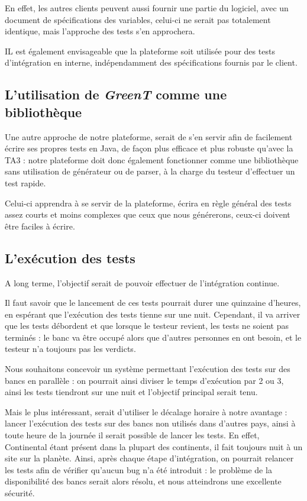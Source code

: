 	En effet, les autres clients peuvent aussi fournir une partie du logiciel, avec un document de spécifications des variables, celui-ci ne serait pas totalement identique, mais l'approche des tests s'en approchera.

	IL est également envisageable que la plateforme soit utilisée pour des tests d'intégration en interne, indépendamment des spécifications fournis par le client.

	\subsection{L'utilisation de \textit{GreenT} comme une bibliothèque}
		Une autre approche de notre plateforme, serait de s'en servir afin de facilement écrire ses propres tests en Java, de façon plus efficace et plus robuste qu'avec la TA3 : notre plateforme doit donc également fonctionner comme une bibliothèque sans utilisation de générateur ou de parser, à la charge du testeur d'effectuer un test rapide. 

		Celui-ci apprendra à se servir de la plateforme, écrira en règle général des tests assez courts et moins complexes que ceux que nous générerons, ceux-ci doivent être faciles à écrire.

	\subsection{L'exécution des tests}
	A long terme, l'objectif serait de pouvoir effectuer de l'intégration continue. 

	Il faut savoir que le lancement de ces tests pourrait durer une quinzaine d'heures, en espérant que l'exécution des tests tienne sur une nuit. Cependant, il va arriver que les tests débordent et que lorsque le testeur revient, les tests ne soient pas terminés : le banc va être occupé alors que d'autres personnes en ont besoin, et le testeur n'a toujours pas les verdicts.

	 Nous souhaitons concevoir un système permettant l'exécution des tests sur des bancs en parallèle : on pourrait ainsi diviser le temps d'exécution par 2 ou 3, ainsi les tests tiendront sur une nuit et l'objectif principal serait tenu.

	 Mais le plus intéressant, serait d'utiliser le décalage horaire à notre avantage : lancer l'exécution des tests sur des bancs non utilisés dans d'autres pays, ainsi à toute heure de la journée il serait possible de lancer les tests. En effet, Continental étant présent dans la plupart des continents, il fait toujours nuit à un site sur la planète. Ainsi, après chaque étape d'intégration, on pourrait relancer les tests afin de vérifier qu'aucun bug n'a été introduit : le problème de la disponibilité des bancs serait alors résolu, et nous atteindrons une excellente sécurité.

